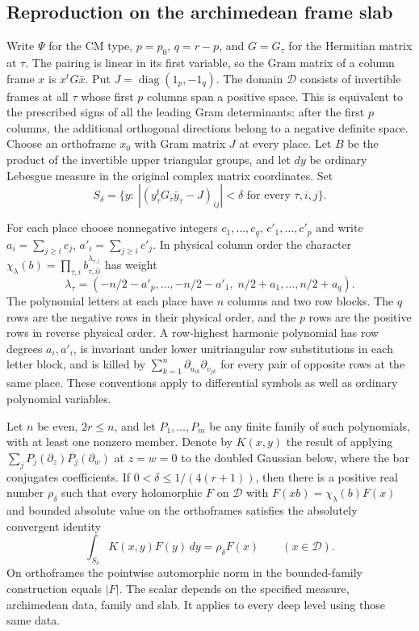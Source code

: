 \subsection{Reproduction on the archimedean frame slab}
\label{arrep:section}

Write $\Psi$ for the CM type, $p=p_0$, $q=r-p$, and $G=G_\tau$
for the Hermitian matrix at $\tau$. The pairing is linear in its
first variable, so the Gram matrix of a column frame $x$ is
$x^tG\bar x$. Put $J=\operatorname{diag}(1_p,-1_q)$. The domain
$\mathcal D$ consists of invertible frames at all $\tau$ whose first $p$
columns span a positive space. This is equivalent to the prescribed
signs of all the leading Gram determinants: after the first $p$
columns, the additional orthogonal directions belong to a negative
definite space. Choose an orthoframe $x_0$ with Gram matrix $J$ at
every place. Let $B$ be the product of the invertible upper triangular
groups, and let $dy$ be ordinary Lebesgue measure in the original
complex matrix coordinates. Set
\[
 S_\delta=\{y:\ |(y_\tau^tG_\tau\bar y_\tau-J)_{ij}|<\delta
                         \text{ for every }\tau,i,j\}.
\]

For each place choose nonnegative integers $c_1,\ldots,c_q$,
$c'_1,\ldots,c'_p$ and write $a_i=\sum_{j\ge i}c_j$,
$a'_i=\sum_{j\ge i}c'_j$. In physical column order the character
$\chi_\lambda(b)=\prod_{\tau,i}b_{\tau,ii}^{\lambda_{\tau,i}}$ has weight
\[
 \lambda_\tau=(-n/2-a'_p,\ldots,-n/2-a'_1,\;
                          n/2+a_1,\ldots,n/2+a_q).
\]
The polynomial letters at each place have $n$ columns and two row
blocks. The $q$ rows are the negative rows in their physical order,
and the $p$ rows are the positive rows in reverse physical order.
A row-highest harmonic polynomial has row degrees $a_i,a'_i$, is
invariant under lower unitriangular row substitutions in each letter
block, and is killed by
$\sum_{k=1}^n\partial_{u_{ik}}\partial_{v_{jk}}$ for every pair
of opposite rows at the same place. These conventions apply to
differential symbols as well as ordinary polynomial variables.

\begin{proposition}\label{arrep:reproduce}
Let $n$ be even, $2r\le n$, and let $P_1,\ldots,P_m$ be any finite
family of such polynomials, with at least one nonzero member. Denote by
$K(x,y)$ the result of applying
$\sum_j P_j(\partial_z)\overline{P_j}(\partial_w)$ at $z=w=0$
to the doubled Gaussian below, where the bar conjugates coefficients.
If $0<\delta\le1/(4(r+1))$, then there is a positive real number
$\rho_\delta$ such that every holomorphic $F$ on $\mathcal D$ with
$F(xb)=\chi_\lambda(b)F(x)$ and bounded absolute value on the
orthoframes satisfies the absolutely convergent identity
\[
         \int_{S_\delta} K(x,y)F(y)\,dy=\rho_\delta F(x)
                               \qquad(x\in\mathcal D).
\]
On orthoframes the pointwise automorphic norm in the bounded-family
construction equals $|F|$. The scalar depends on the specified measure,
archimedean data, family and slab. It applies to every deep level
using those same data.
\end{proposition}

